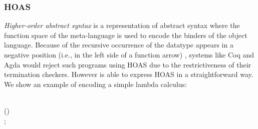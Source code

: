 \subsubsection{HOAS}

\emph{Higher-order abstract syntax} is a representation of abstract
syntax where the function space of the meta-language is used to encode
the binders of the object language. Because of the recursive
occurrence of the datatype appears in a negative position (i.e., in
the left side of a function arrow) 
, systems like Coq and Agda would reject such programs using
HOAS due to the restrictiveness of their termination checkers. However
\sufcc is able to express HOAS in a straightforward way. We show an
example of encoding a simple lambda calculus:
\begin{hscode}\SaveRestoreHook
{}%
%
%
%
%
%
\>[3]{}\;\mathrel{=}\;\<[E]%
\\
\>[3]{}\<[5]%
\>[5]{}\mid {}\<[5E]%
\>[8]{}\;(\to {}){}\<[E]%
\\
\>[3]{}\<[5]%
\>[5]{}\mid {}\<[5E]%
\>[8]{}\;\;;{}\<[E]%
\ColumnHook
\end{hscode}\resethooks


